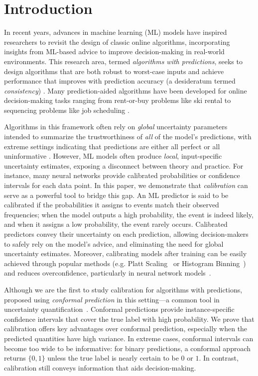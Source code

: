 \section{Introduction}
In recent years, advances in machine learning (ML) models have inspired researchers to revisit the design of classic online algorithms, incorporating insights from ML-based advice to improve decision-making in real-world environments. This research area, termed \emph{algorithms with predictions}, seeks to design algorithms that are both robust to worst-case inputs and achieve performance that improves with prediction accuracy (a desideratum termed \emph{consistency}) \citep{Lykouris18:Competitive}. Many prediction-aided algorithms have been developed for online decision-making tasks ranging from rent-or-buy problems like ski rental \citep{Purohit18:Improving, Anand20:Customizing, Sun24:Online} to sequencing problems like job scheduling \citep{Cho22:Scheduling}.

Algorithms in this framework often rely on \emph{global} uncertainty parameters intended to summarize the trustworthiness of \emph{all} of the model's predictions, with extreme settings indicating that predictions are either all perfect or all uninformative \citep[e.g.,][]{Mahidian07:Allocating, Lykouris18:Competitive, Purohit18:Improving, Rohatgi20:Near, Wei20:Optimal, Antoniadis20:Secretary}. However, ML models often produce \emph{local}, input-specific uncertainty estimates, exposing a disconnect between theory and practice. For instance, many neural networks provide calibrated probabilities or confidence intervals for each data point. In this paper, we demonstrate that \emph{calibration} can serve as a powerful tool to bridge this gap. An ML predictor is said to be calibrated if the probabilities it assigns to events match their observed frequencies; when the model outputs a high probability, the event is indeed likely, and when it assigns a low probability, the event rarely occurs. Calibrated predictors convey their uncertainty on each prediction, allowing decision-makers to safely rely on the model's advice, and eliminating the need for global uncertainty estimates. Moreover, calibrating models after training can be easily achieved through popular methods (e.g. Platt Scaling~\citep{platt1999probabilistic} or Histogram Binning~\citep{zadrozny2001obtaining}) and reduces overconfidence, particularly in neural network models~\citep{vasilev2023calibration}.

Although we are the first to study calibration for algorithms with predictions, \citet{Sun24:Online} proposed using \emph{conformal prediction} in this setting---a common tool in uncertainty quantification~\citep{vovk2005algorithmic, shafer2008tutorial}. Conformal predictions provide instance-specific confidence intervals that cover the true label with high probability. We prove that calibration offers key advantages over conformal prediction, especially when the predicted quantities have high variance. In extreme cases, conformal intervals can become too wide to be informative: for binary predictions, a conformal approach returns $\{0,1\}$ unless the true label is nearly certain to be $0$ or $1$. In contrast, calibration still conveys information that aids decision-making.

